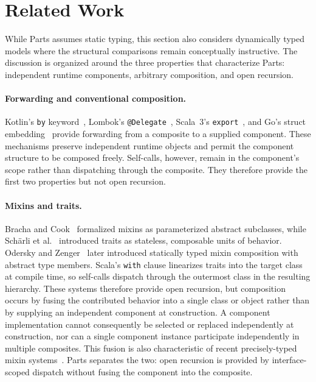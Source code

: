 \documentclass[acmsmall,screen,review,anonymous]{acmart}
\theoremstyle{acmplain}
\newcommand{\code}[1]{\texttt{#1}}
\begin{document}
\section{Related Work}
\label{sec:related}

While Parts assumes static typing, this section also considers dynamically typed
models where the structural comparisons remain conceptually instructive. The
discussion is organized around the three properties that characterize Parts:
independent runtime components, arbitrary composition, and open recursion.

\paragraph{Forwarding and conventional composition.}
Kotlin's \code{by} keyword~\cite{kotlin}, Lombok's \code{@Delegate}~\cite{lombok},
Scala~3's \code{export}~\cite{scala3export}, and Go's struct
embedding~\cite{go} provide forwarding from a composite to a supplied component.
These mechanisms preserve independent runtime objects and permit the component
structure to be composed freely. Self-calls, however, remain in the component's
scope rather than dispatching through the composite. They therefore provide the
first two properties but not open recursion.

\paragraph{Mixins and traits.}
Bracha and Cook~\cite{bracha1990} formalized mixins as parameterized abstract
subclasses, while Sch\"arli et al.~\cite{scharli2003} introduced traits as
stateless, composable units of behavior. Odersky and Zenger~\cite{odersky2005}
later introduced statically typed mixin composition with abstract type members.
Scala's \code{with} clause linearizes traits into the target class at compile
time, so self-calls dispatch through the outermost class in the resulting
hierarchy. These systems therefore provide open recursion, but composition
occurs by fusing the contributed behavior into a single class or object rather
than by supplying an independent component at construction. A component
implementation cannot consequently be selected or replaced independently at
construction, nor can a single component instance participate independently in
multiple composites. This fusion is also characteristic of recent
precisely-typed mixin systems~\cite{fanparreaux2023}. Parts separates the two:
open recursion is provided by interface-scoped dispatch without fusing the
component into the composite.
\end{document}
